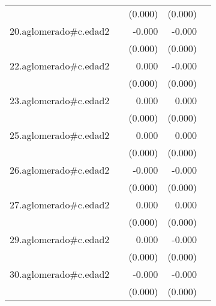 {\begin{longtable}{l*{4}{D{.}{.}{-1}}}
            &                     &     (0.000)         &     (0.000)         &                     \\
\addlinespace
20.aglomerado#c.edad2&                     &      -0.000         &      -0.000\sym{**} &                     \\
            &                     &     (0.000)         &     (0.000)         &                     \\
\addlinespace
22.aglomerado#c.edad2&                     &       0.000         &      -0.000         &                     \\
            &                     &     (0.000)         &     (0.000)         &                     \\
\addlinespace
23.aglomerado#c.edad2&                     &       0.000\sym{*}  &       0.000         &                     \\
            &                     &     (0.000)         &     (0.000)         &                     \\
\addlinespace
25.aglomerado#c.edad2&                     &       0.000\sym{*}  &       0.000         &                     \\
            &                     &     (0.000)         &     (0.000)         &                     \\
\addlinespace
26.aglomerado#c.edad2&                     &      -0.000         &      -0.000\sym{*}  &                     \\
            &                     &     (0.000)         &     (0.000)         &                     \\
\addlinespace
27.aglomerado#c.edad2&                     &       0.000\sym{*}  &       0.000         &                     \\
            &                     &     (0.000)         &     (0.000)         &                     \\
\addlinespace
29.aglomerado#c.edad2&                     &       0.000         &      -0.000         &                     \\
            &                     &     (0.000)         &     (0.000)         &                     \\
\addlinespace
30.aglomerado#c.edad2&                     &      -0.000         &      -0.000\sym{**} &                     \\
            &                     &     (0.000)         &     (0.000)         &                     \\

\end{longtable}}
